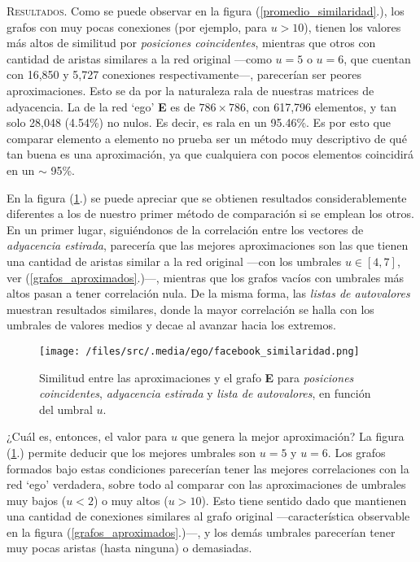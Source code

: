 \vspace{1em}
\noindent \textsc{Resultados}. Como se puede observar en la figura (\ref{promedio_similaridad}.), los grafos con muy pocas conexiones (por ejemplo, para $u > 10$), tienen los valores más altos de similitud por \textit{posiciones coincidentes}, mientras que otros con cantidad de aristas similares a la red original ---como $u = 5$ o $u = 6$, que cuentan con 16,850 y 5,727 conexiones respectivamente---, parecerían ser peores aproximaciones. Esto se da por la naturaleza rala de nuestras matrices de adyacencia. La de la red `ego' \textbf{E} es de $786 \times 786$, con 617,796 elementos, y tan solo 28,048 (4.54\%) no nulos. Es decir, es rala en un 95.46\%. Es por esto que comparar elemento a elemento no prueba ser un método muy descriptivo de qué tan buena es una aproximación, ya que cualquiera con pocos elementos coincidirá en un $\sim$ 95\%.

\vspace{1em}
En la figura (\ref{grafo_correlaciones}.) se puede apreciar que se obtienen resultados considerablemente diferentes a los de nuestro primer método de comparación si se emplean los otros. En un primer lugar, siguiéndonos de la correlación entre los vectores de \textit{adyacencia estirada}, parecería que las mejores aproximaciones son las que tienen una cantidad de aristas similar a la red original ---con los umbrales $u \in [4,7]$, ver (\ref{grafos_aproximados}.)---, mientras que los grafos vacíos con umbrales más altos pasan a tener correlación nula. De la misma forma, las \textit{listas de autovalores} muestran resultados similares, donde la mayor correlación se halla con los umbrales de valores medios y decae al avanzar hacia los extremos.  


\begin{figure}[!htbp]
\centering
\texttt{[image: /files/src/.media/ego/facebook\_similaridad.png]}
\caption{Similitud entre las aproximaciones y el grafo \textbf{E} para \textit{posiciones coincidentes}, \textit{adyacencia estirada} y \textit{lista de autovalores}, en función del umbral $u$.}
\label{grafo_correlaciones}
\end{figure}

\vspace{1em}
¿Cuál es, entonces, el valor para $u$ que genera la mejor aproximación? 
La figura (\ref{grafo_correlaciones}.) permite deducir que los mejores umbrales son $u = 5$ y $u = 6$. Los grafos formados bajo estas condiciones parecerían tener las mejores correlaciones con la red `ego' verdadera, sobre todo al comparar con las aproximaciones de umbrales muy bajos ($u < 2$) o muy altos ($u > 10$). Esto tiene sentido dado que mantienen una cantidad de conexiones similares al grafo original ---característica observable en la figura (\ref{grafos_aproximados}.)---, y los demás umbrales parecerían tener muy pocas aristas (hasta ninguna) o demasiadas.

